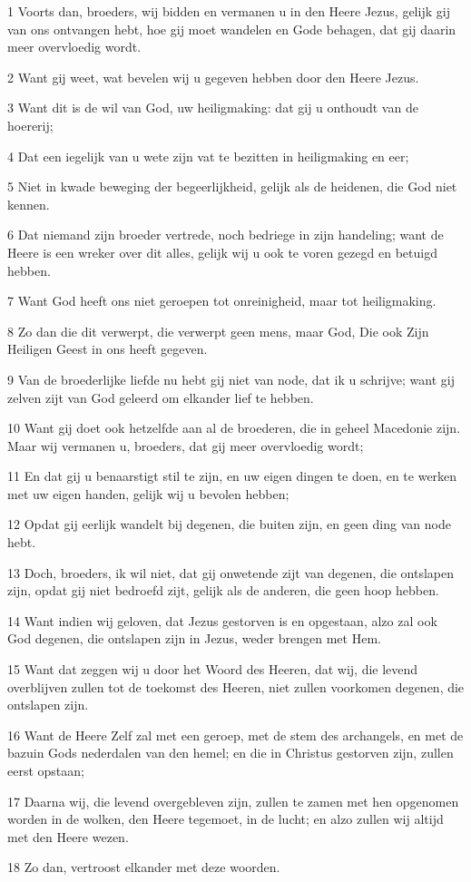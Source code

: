 \par 1 Voorts dan, broeders, wij bidden en vermanen u in den Heere Jezus, gelijk gij van ons ontvangen hebt, hoe gij moet wandelen en Gode behagen, dat gij daarin meer overvloedig wordt.
\par 2 Want gij weet, wat bevelen wij u gegeven hebben door den Heere Jezus.
\par 3 Want dit is de wil van God, uw heiligmaking: dat gij u onthoudt van de hoererij;
\par 4 Dat een iegelijk van u wete zijn vat te bezitten in heiligmaking en eer;
\par 5 Niet in kwade beweging der begeerlijkheid, gelijk als de heidenen, die God niet kennen.
\par 6 Dat niemand zijn broeder vertrede, noch bedriege in zijn handeling; want de Heere is een wreker over dit alles, gelijk wij u ook te voren gezegd en betuigd hebben.
\par 7 Want God heeft ons niet geroepen tot onreinigheid, maar tot heiligmaking.
\par 8 Zo dan die dit verwerpt, die verwerpt geen mens, maar God, Die ook Zijn Heiligen Geest in ons heeft gegeven.
\par 9 Van de broederlijke liefde nu hebt gij niet van node, dat ik u schrijve; want gij zelven zijt van God geleerd om elkander lief te hebben.
\par 10 Want gij doet ook hetzelfde aan al de broederen, die in geheel Macedonie zijn. Maar wij vermanen u, broeders, dat gij meer overvloedig wordt;
\par 11 En dat gij u benaarstigt stil te zijn, en uw eigen dingen te doen, en te werken met uw eigen handen, gelijk wij u bevolen hebben;
\par 12 Opdat gij eerlijk wandelt bij degenen, die buiten zijn, en geen ding van node hebt.
\par 13 Doch, broeders, ik wil niet, dat gij onwetende zijt van degenen, die ontslapen zijn, opdat gij niet bedroefd zijt, gelijk als de anderen, die geen hoop hebben.
\par 14 Want indien wij geloven, dat Jezus gestorven is en opgestaan, alzo zal ook God degenen, die ontslapen zijn in Jezus, weder brengen met Hem.
\par 15 Want dat zeggen wij u door het Woord des Heeren, dat wij, die levend overblijven zullen tot de toekomst des Heeren, niet zullen voorkomen degenen, die ontslapen zijn.
\par 16 Want de Heere Zelf zal met een geroep, met de stem des archangels, en met de bazuin Gods nederdalen van den hemel; en die in Christus gestorven zijn, zullen eerst opstaan;
\par 17 Daarna wij, die levend overgebleven zijn, zullen te zamen met hen opgenomen worden in de wolken, den Heere tegemoet, in de lucht; en alzo zullen wij altijd met den Heere wezen.
\par 18 Zo dan, vertroost elkander met deze woorden.

